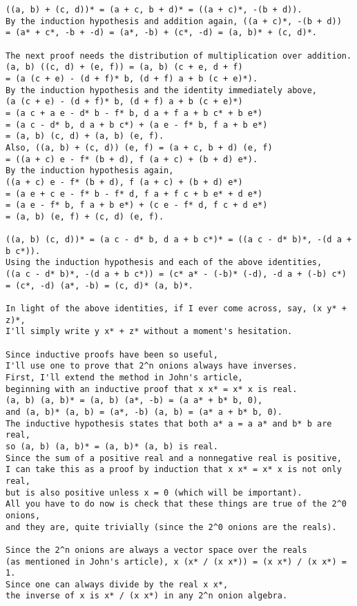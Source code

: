\begin{verbatim}
((a, b) + (c, d))* = (a + c, b + d)* = ((a + c)*, -(b + d)).
By the induction hypothesis and addition again, ((a + c)*, -(b + d))
= (a* + c*, -b + -d) = (a*, -b) + (c*, -d) = (a, b)* + (c, d)*.

The next proof needs the distribution of multiplication over addition.
(a, b) ((c, d) + (e, f)) = (a, b) (c + e, d + f)
= (a (c + e) - (d + f)* b, (d + f) a + b (c + e)*).
By the induction hypothesis and the identity immediately above,
(a (c + e) - (d + f)* b, (d + f) a + b (c + e)*)
= (a c + a e - d* b - f* b, d a + f a + b c* + b e*)
= (a c - d* b, d a + b c*) + (a e - f* b, f a + b e*)
= (a, b) (c, d) + (a, b) (e, f).
Also, ((a, b) + (c, d)) (e, f) = (a + c, b + d) (e, f)
= ((a + c) e - f* (b + d), f (a + c) + (b + d) e*).
By the induction hypothesis again,
((a + c) e - f* (b + d), f (a + c) + (b + d) e*)
= (a e + c e - f* b - f* d, f a + f c + b e* + d e*)
= (a e - f* b, f a + b e*) + (c e - f* d, f c + d e*)
= (a, b) (e, f) + (c, d) (e, f).

((a, b) (c, d))* = (a c - d* b, d a + b c*)* = ((a c - d* b)*, -(d a + b c*)).
Using the induction hypothesis and each of the above identities,
((a c - d* b)*, -(d a + b c*)) = (c* a* - (-b)* (-d), -d a + (-b) c*)
= (c*, -d) (a*, -b) = (c, d)* (a, b)*.

In light of the above identities, if I ever come across, say, (x y* + z)*,
I'll simply write y x* + z* without a moment's hesitation.

Since inductive proofs have been so useful,
I'll use one to prove that 2^n onions always have inverses.
First, I'll extend the method in John's article,
beginning with an inductive proof that x x* = x* x is real.
(a, b) (a, b)* = (a, b) (a*, -b) = (a a* + b* b, 0),
and (a, b)* (a, b) = (a*, -b) (a, b) = (a* a + b* b, 0).
The inductive hypothesis states that both a* a = a a* and b* b are real,
so (a, b) (a, b)* = (a, b)* (a, b) is real.
Since the sum of a positive real and a nonnegative real is positive,
I can take this as a proof by induction that x x* = x* x is not only real,
but is also positive unless x = 0 (which will be important).
All you have to do now is check that these things are true of the 2^0 onions,
and they are, quite trivially (since the 2^0 onions are the reals).

Since the 2^n onions are always a vector space over the reals
(as mentioned in John's article), x (x* / (x x*)) = (x x*) / (x x*) = 1.
Since one can always divide by the real x x*,
the inverse of x is x* / (x x*) in any 2^n onion algebra.


\end{verbatim}
